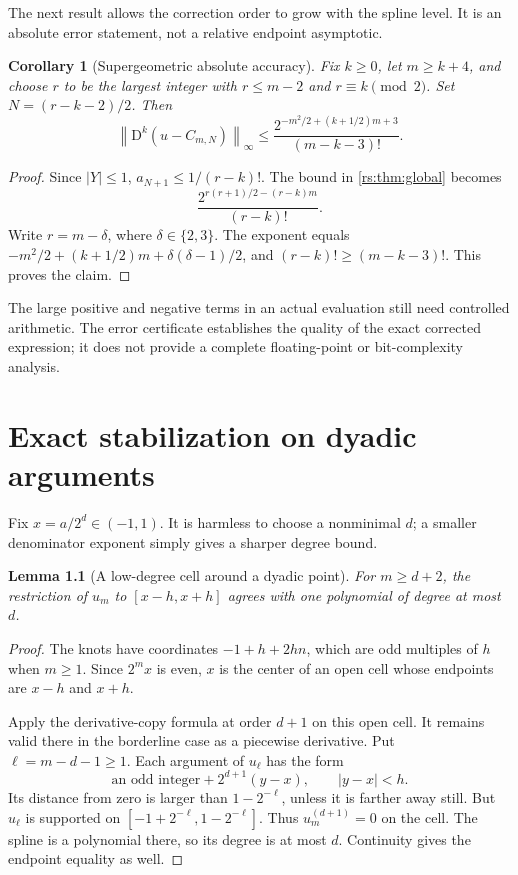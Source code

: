 \documentclass[11pt,a4paper,oneside,openany]{book}
\numberwithin{equation}{chapter}
\newtheorem{lemma}[theorem]{Lemma}
\newtheorem{corollary}[theorem]{Corollary}
\theoremstyle{definition}
\theoremstyle{remark}
\newcommand{\norm}[1]{\left\lVert #1\right\rVert}
\newcommand{\D}{\mathrm D}
\begin{document}
The next result allows the correction order to grow with the spline
level. It is an absolute error statement, not a relative endpoint
asymptotic.

\begin{corollary}[Supergeometric absolute accuracy]\label{rs:cor:growing}
Fix $k\geq0$, let $m\geq k+4$, and choose $r$ to be the largest integer
with $r\leq m-2$ and $r\equiv k\pmod2$. Set
$N=(r-k-2)/2$. Then
\begin{equation}
 \norm{\D^k(u-C_{m,N})}_\infty
 \leq \frac{2^{-m^2/2+(k+1/2)m+3}}{(m-k-3)!}.
 \label{rs:eq:growing-bound}
\end{equation}
\end{corollary}
\begin{proof}
Since $|Y|\leq1$, $a_{N+1}\leq1/(r-k)!$. The bound in
\cref{rs:thm:global} becomes
\begin{equation}
 \frac{2^{r(r+1)/2-(r-k)m}}{(r-k)!}.
\end{equation}
Write $r=m-\delta$, where $\delta\in\{2,3\}$. The exponent equals
$-m^2/2+(k+1/2)m+\delta(\delta-1)/2$, and
$(r-k)!\geq(m-k-3)!$. This proves the claim.
\end{proof}

The large positive and negative terms in an actual evaluation still
need controlled arithmetic. The error certificate establishes the
quality of the exact corrected expression; it does not provide a
complete floating-point or bit-complexity analysis.
\chapter{Exact stabilization on dyadic arguments}\label{rs:sec:dyadic}

Fix $x=a/2^d\in(-1,1)$. It is harmless to choose a nonminimal $d$;
a smaller denominator exponent simply gives a sharper degree bound.

\begin{lemma}[A low-degree cell around a dyadic point]\label{rs:lem:dyadic-cell}
For $m\geq d+2$, the restriction of $u_m$ to
$[x-h,x+h]$ agrees with one polynomial of degree at most $d$.
\end{lemma}
\begin{proof}
The knots have coordinates $-1+h+2hn$, which are odd multiples of
$h$ when $m\geq1$. Since $2^mx$ is even, $x$ is the center of an
open cell whose endpoints are $x-h$ and $x+h$.

Apply the derivative-copy formula at order $d+1$ on this open cell.
It remains valid there in the borderline case as a piecewise derivative.
Put $\ell=m-d-1\geq1$. Each argument of $u_\ell$ has the form
\begin{equation}
 \text{an odd integer}+2^{d+1}(y-x),\qquad |y-x|<h.
\end{equation}
Its distance from zero is larger than $1-2^{-\ell}$, unless it is
farther away still. But $u_\ell$ is supported on
$[-1+2^{-\ell},1-2^{-\ell}]$. Thus $u_m^{(d+1)}=0$ on the cell.
The spline is a polynomial there, so its degree is at most $d$.
Continuity gives the endpoint equality as well.
\end{proof}
\end{document}
